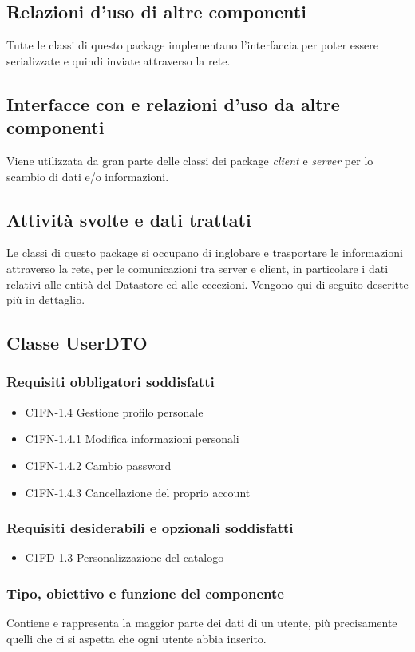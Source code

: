 \subsection*{Relazioni d'uso di altre componenti} Tutte le classi di questo
package implementano l'interfaccia  per poter essere
serializzate e quindi inviate attraverso la rete. 
\subsection*{Interfacce con e relazioni d'uso da altre componenti} Viene
utilizzata da gran parte delle classi dei package \emph{client} e \emph{server}
per lo scambio di dati e/o informazioni. 
\subsection*{Attivit\`a svolte e dati trattati}
Le classi di questo package si occupano di inglobare e trasportare
le informazioni attraverso la rete, per le comunicazioni tra server e client,
in particolare i dati relativi alle entit\`a del Datastore ed alle eccezioni.
Vengono qui di seguito descritte pi\`u in dettaglio.

\subsection{Classe UserDTO}
\subsubsection*{Requisiti obbligatori soddisfatti}
\begin{itemize}
	\item C1FN-1.4 Gestione profilo personale
	\item C1FN-1.4.1 Modifica informazioni personali
	\item C1FN-1.4.2 Cambio password
	\item C1FN-1.4.3 Cancellazione del proprio account
\end{itemize}
\subsubsection*{Requisiti desiderabili e opzionali soddisfatti}
\begin{itemize}
    \item C1FD-1.3 Personalizzazione del catalogo
\end{itemize}
\subsubsection*{Tipo, obiettivo e funzione del componente}
Contiene e rappresenta la maggior parte dei dati di un utente, pi\`u
precisamente quelli che ci si aspetta che ogni utente abbia inserito.
